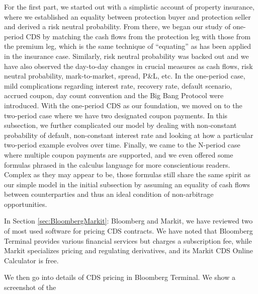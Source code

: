 \documentclass{jss}
\begin{document}
For the first part, we started out with a simplistic account of property insurance, where we established an equality between protection buyer and protection seller and derived a risk neutral probability. From there, we began our study of one-period CDS by matching the cash flows from the protection leg with those from the premium leg, which is the same technique of ``equating'' as has been applied in the insurance case. Similarly, risk neutral probability was backed out and we have also observed the day-to-day changes in crucial measures as cash flows, risk neutral probability, mark-to-market, spread, P\&L, etc. In the one-period case, mild complications regarding interest rate, recovery rate, default scenario, accrued coupon, day count convention and the Big Bang Protocol were introduced. With the one-period CDS as our foundation, we moved on to the two-period case where we have two designated coupon payments. In this subsection, we further complicated our model by dealing with non-constant probability of default, non-constant interest rate and looking at how a particular two-period example evolves over time. Finally, we came to the N-period case where multiple coupon payments are supported, and we even offered some formulas phrased in the calculus language for more conscientious readers. Complex as they may appear to be, those formulas still share the same spirit as our simple model in the initial subsection by assuming an equality of cash flows between counterparties and thus an ideal condition of non-arbitrage opportunities. 


In Section \ref{sec:BloombergMarkit}: Bloomberg and Markit, we have reviewed two of most used software for pricing CDS contracts. We have noted that Bloomberg Terminal provides various financial services but charges a subscription fee, while Markit specializes pricing and regulating derivatives, and its Markit CDS Online Calculator is free. 

We then go into details of CDS pricing in Bloomberg Terminal. We show a screenshot of the 

\newpage

\cite{barclays}
\cite{bloomberg}
\cite{openGamma}
\cite{glossary}
\cite{cdsOrigins}
\cite{blythe}
\cite{jk}
\cite{rates}
\cite{kane:david}
\cite{creditDerivatives}
\end{document}
